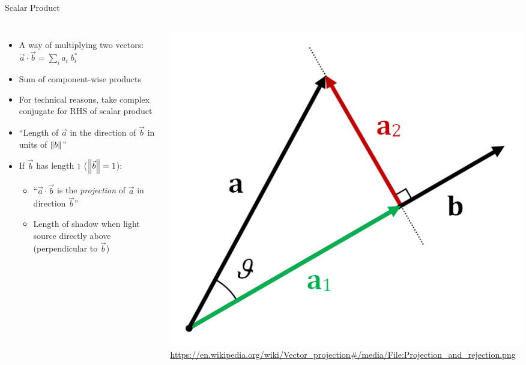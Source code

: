 \begin{frame}[fragile]{Scalar Product}
%
\begin{columns}[T]
\begin{itemize}
\item A way of multiplying two vectors: $\vec{a} \cdot \vec{b} = \sum_i a_i \; b_i^*$
\item Sum of component-wise products
\item For technical reasons, take complex conjugate for RHS of scalar product
\item \enquote{Length of $\vec{a}$ in the direction of $\vec{b}$ in units of $\norm{b}$}
\item If $\vec{b}$ has length $1$ ($\norm{\vec{b}} = 1$):
	\begin{itemize}
	\item \enquote{$\vec{a} \cdot \vec{b}$ is the \emph{projection} of $\vec{a}$ in direction $\vec{b}$}
	\item Length of shadow when light source directly above (perpendicular to $\vec{b}$)
	\end{itemize}
\end{itemize}
%
\begin{center}
	\tiny
	\includegraphics[width=\linewidth]{./gfx/Projection}
	\url{https://en.wikipedia.org/wiki/Vector_projection#/media/File:Projection_and_rejection.png}
\end{center}
\end{columns}
%
\end{frame}

